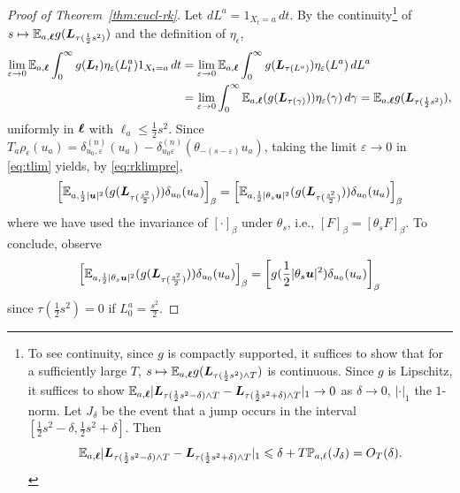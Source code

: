 \documentclass[11pt,a4paper]{article}
\begin{document}
\begin{proof}[Proof of Theorem~\ref{thm:eucl-rk}]
  Let $dL^a=1_{X_t=a} \, dt$.
  By the continuity\footnote{
    To see continuity, since $g$ is compactly supported, it suffices to show that for a sufficiently large $T$,
    $s\mapsto \mathbb{E}_{a,\boldsymbol{\ell}} g(\boldsymbol{L}_{\tau(\frac12 s^2) \wedge T})$ is continuous.
    Since $g$ is Lipschitz, it suffices to show
    $\mathbb{E}_{a,\boldsymbol{\ell}}|\boldsymbol{L}_{\tau(\frac12 s^2-\delta)\wedge
      T}-\boldsymbol{L}_{\tau(\frac12 s^2 + \delta)\wedge T}|_{1} \to 0$ as
    $\delta \to 0$, $|\cdot|_{1}$ the $1$-norm.
    Let $J_{\delta}$ be the event that a jump occurs in the interval $[\frac12
    s^2-\delta, \frac12 s^{2} + \delta]$. Then
    \begin{equation*}
      \mathbb{E}_{a,\boldsymbol{\ell}}|\boldsymbol{L}_{\tau(\frac12 s^2-\delta)\wedge T}-\boldsymbol{L}_{\tau(\frac12 s^2 + \delta)\wedge T}|_1
      \leqslant \delta + T \mathbb{P}_{a,\ell}(J_{\delta}) = O_{T}(\delta).
    \end{equation*}
  }
  of $s\mapsto \mathbb{E}_{a,\boldsymbol{\ell}} g(\boldsymbol{L}_{\tau(\frac12 s^2)})$
  and the definition of $\eta_\epsilon$,
    \begin{align}
    \label{eq:rklimpre}
    \lim_{\varepsilon\to 0}
    \mathbb{E}_{a,\boldsymbol{\ell}}\int_{0}^{\infty}  g(\boldsymbol{L}_{t})
    \eta_{\varepsilon}(L^{a}_{t})1_{X_{t}=a} \, dt
    &=
    \lim_{\varepsilon\to 0} 
    \mathbb{E}_{a,\boldsymbol{\ell}}\int_{0}^{\infty}  g(\boldsymbol{L}_{ \tau(L^{a})})
      \eta_{\varepsilon}(L^{a}) \, dL^{a}
      \nonumber\\
    &=
    \lim_{\varepsilon\to 0} 
    \int_{0}^{\infty} \mathbb{E}_{a,\boldsymbol{\ell}}( g(\boldsymbol{L}_{\tau(\gamma)}))
    \eta_{\varepsilon}(\gamma) \, d\gamma
    = \mathbb{E}_{a,\boldsymbol{\ell}}g(\boldsymbol{L}_{\tau(\frac12 s^2)}),
  \end{align}
  uniformly in $\boldsymbol{\ell}$ with $\ell_a \leq \frac12 s^2$.
  Since $T_a\rho_{\epsilon}(u_a) = \delta_{u_0,\varepsilon}^{(n)}(u_a) -
  \delta_{u_0\varepsilon}^{(n)}(\theta_{-(s-\varepsilon)}u_a)$,
  taking the
  limit $\varepsilon \rightarrow 0$  in \eqref{eq:tlim}
  yields, by \eqref{eq:rklimpre},
  \begin{equation}
    \uspin{ \E_{a,\frac{1}{2}|\V{u}|^2}(g(\V{L}_{\tau(\frac{s^2}{2})}))\delta_{u_0}(u_a)}_{\beta}
    =
    \uspin{
      \E_{a,\frac{1}{2}|\theta_s\V{u}|^2}(g(\V{L}_{\tau(\frac{s^2}{2})}))\delta_{u_0}(u_a)}_{\beta}
  \end{equation}
  where we have used the invariance of $[\cdot]_\beta$ under
  $\theta_s$, i.e., $[F]_{\beta} = [\theta_{s}F]_{\beta}$.
  To conclude, observe
  \begin{equation}
   \uspin{
      \E_{a,\frac{1}{2}|\theta_s\V{u}|^2}(g(\V{L}_{\tau(\frac{s^2}{2})}))\delta_{u_0}(u_a)}_{\beta} = \uspin{ g(\frac{1}{2}|\theta_s\V{u}|^2)\delta_{u_0}(u_a)}_\beta
  \end{equation}
  since $\tau(\frac{1}{2}s^{2})=0$ if $L_0^a=\frac{s^2}{2}$.
\end{proof}
\end{document}
